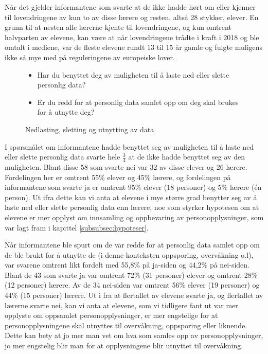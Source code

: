 Når det gjelder informantene som svarte at de ikke hadde hørt om eller kjenner til lovendringene av kun to av disse lærere og resten, altså 28 stykker, elever. En grunn til at nesten alle lærerne kjente til lovendringene, og kun omtrent halvparten av elevene, kan være at når lovendringene trådte i kraft i 2018 og ble omtalt i mediene, var de fleste elevene rundt 13 til 15 år gamle og fulgte muligens ikke så mye med på reguleringene av europeiske lover. 

\begin{figure}[H]
    \centering
    \begin{itemize}
        \item Har du benyttet deg av muligheten til å laste ned eller slette personlig data?
        \item Er du redd for at personlig data samlet opp om deg skal brukes for å utnytte deg?
    \end{itemize}
    \caption{Nedlasting, sletting og utnytting av data}
\end{figure}
I spørsmålet om informantene hadde benyttet seg av muligheten til å laste ned eller slette personlig data svarte hele $\frac{3}{4}$ at de ikke hadde benyttet seg av den muligheten. Blant disse 58 som svarte nei var 32 av disse elever og 26 lærere. Fordelingen her er omtrent 55\% elever og 45\% lærere, og fordelingen på informantene som svarte ja er omtrent 95\% elever (18 personer) og 5\% lærere (én person). Ut ifra dette kan vi anta at elevene i mye større grad benytter seg av å laste ned eller slette personlig data enn lærere, noe som styrker hypotesen om at elevene er mer opplyst om innsamling og oppbevaring av personopplysninger, som var lagt fram i kapittel \ref{subsubsec:hypoteser}.

Når informantene ble spurt om de var redde for at personlig data samlet opp om de ble brukt for å utnytte de (i denne konteksten oppsporing, overvåkning o.l), var svarene omtrent likt fordelt med 55,8\% på ja-siden og 44,2\% på nei-siden. Blant de 43 som svarte ja var omtrent 72\% (31 personer) elever og omtrent 28\% (12 personer) lærere. Av de 34 nei-siden var omtrent 56\% elever (19 personer) og 44\% (15 personer) lærere. Ut i fra at flertallet av elevene svarte ja, og flertallet av lærerne svarte nei, kan vi anta at elevene, som vi tidligere fant ut var mer opplyste om oppsamlet personopplysninger, er mer engstelige for at personopplysningene skal utnyttes til overvåkning, oppsporing eller liknende. Dette kan bety at jo mer man vet om hva som samles opp av personopplysninger, jo mer engstelig blir man for at opplysningene blir utnyttet til overvåkning.

